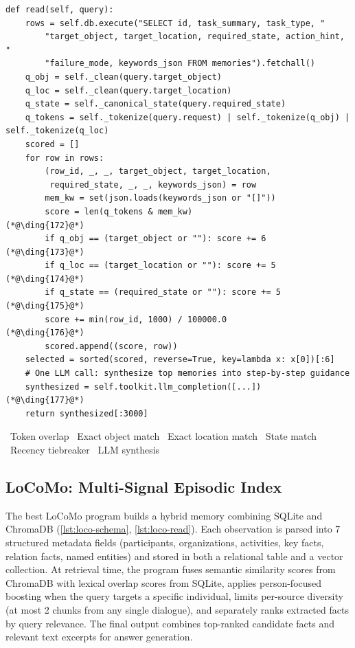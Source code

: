 \begin{lstlisting}[style=evolvedcode, caption={\textcolor{red}{[Revised]} ALFWorld evolved \texttt{read()} --- weighted scoring with exact-match bonuses.}, label=lst:alf-read]
def read(self, query):
    rows = self.db.execute("SELECT id, task_summary, task_type, "
        "target_object, target_location, required_state, action_hint, "
        "failure_mode, keywords_json FROM memories").fetchall()
    q_obj = self._clean(query.target_object)
    q_loc = self._clean(query.target_location)
    q_state = self._canonical_state(query.required_state)
    q_tokens = self._tokenize(query.request) | self._tokenize(q_obj) | self._tokenize(q_loc)
    scored = []
    for row in rows:
        (row_id, _, _, target_object, target_location,
         required_state, _, _, keywords_json) = row
        mem_kw = set(json.loads(keywords_json or "[]"))
        score = len(q_tokens & mem_kw)                        (*@\ding{172}@*)
        if q_obj == (target_object or ""): score += 6         (*@\ding{173}@*)
        if q_loc == (target_location or ""): score += 5       (*@\ding{174}@*)
        if q_state == (required_state or ""): score += 5      (*@\ding{175}@*)
        score += min(row_id, 1000) / 100000.0                 (*@\ding{176}@*)
        scored.append((score, row))
    selected = sorted(scored, reverse=True, key=lambda x: x[0])[:6]
    # One LLM call: synthesize top memories into step-by-step guidance
    synthesized = self.toolkit.llm_completion([...])           (*@\ding{177}@*)
    return synthesized[:3000]
\end{lstlisting}
\vspace{-0.5em}
{\scriptsize {}~Token overlap \quad {}~Exact object match \quad {}~Exact location match \quad {}~State match \quad {}~Recency tiebreaker \quad {}~LLM synthesis}


\subsection{LoCoMo: Multi-Signal Episodic Index}
\label{app:evolved-locomo}

The best LoCoMo program builds a hybrid memory combining SQLite and ChromaDB (\autoref{lst:loco-schema}, \autoref{lst:loco-read}).
Each observation is parsed into 7 structured metadata fields (participants, organizations, activities, key facts, relation facts, named entities) and stored in both a relational table and a vector collection.
At retrieval time, the program fuses semantic similarity scores from ChromaDB with lexical overlap scores from SQLite, applies person-focused boosting when the query targets a specific individual, limits per-source diversity (at most 2 chunks from any single dialogue), and separately ranks extracted facts by query relevance.
The final output combines top-ranked candidate facts and relevant text excerpts for answer generation.

